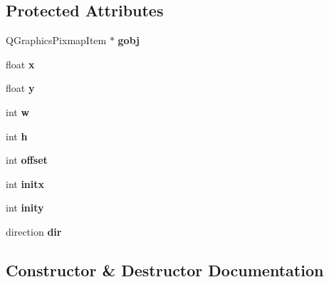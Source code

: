 \subsection*{Protected Attributes}
\begin{DoxyCompactItemize}
\item 
\hypertarget{class_personnage_a6b996f03f323c2c74c5087ea69845a12}{}Q\+Graphics\+Pixmap\+Item $\ast$ {\bfseries gobj}\label{class_personnage_a6b996f03f323c2c74c5087ea69845a12}

\item 
\hypertarget{class_personnage_ad69bcd59258593fb200adb0e86bd7e9b}{}float {\bfseries x}\label{class_personnage_ad69bcd59258593fb200adb0e86bd7e9b}

\item 
\hypertarget{class_personnage_a3827e0cf147db7cc31e3967b23c4395d}{}float {\bfseries y}\label{class_personnage_a3827e0cf147db7cc31e3967b23c4395d}

\item 
\hypertarget{class_personnage_ab246d91c6787ccd5cec5664f7e5d478a}{}int {\bfseries w}\label{class_personnage_ab246d91c6787ccd5cec5664f7e5d478a}

\item 
\hypertarget{class_personnage_a5dd35ace58df8299a92fddee390e1e55}{}int {\bfseries h}\label{class_personnage_a5dd35ace58df8299a92fddee390e1e55}

\item 
\hypertarget{class_personnage_a9ea72b045c379d8fa5938fcb7129ace2}{}int {\bfseries offset}\label{class_personnage_a9ea72b045c379d8fa5938fcb7129ace2}

\item 
\hypertarget{class_personnage_a7a74d1843f448cb007e5c4db909f9bac}{}int {\bfseries initx}\label{class_personnage_a7a74d1843f448cb007e5c4db909f9bac}

\item 
\hypertarget{class_personnage_ac94d042476be54e7a84446a35aaa82e1}{}int {\bfseries inity}\label{class_personnage_ac94d042476be54e7a84446a35aaa82e1}

\item 
\hypertarget{class_personnage_a03d309b13ca5e26fcc04dca85378baf8}{}direction {\bfseries dir}\label{class_personnage_a03d309b13ca5e26fcc04dca85378baf8}

\end{DoxyCompactItemize}


\subsection{Constructor \& Destructor Documentation}
\hypertarget{class_personnage_ac0d494004d7fc8aac08112ff5ffacfe9}{}
